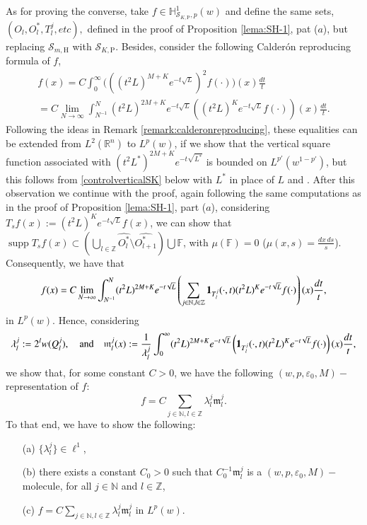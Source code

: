 \documentclass[11pt, a4paper,leqno]{amsart}
\newcommand{\mm}{\mathfrak{m}}
\renewcommand{\chi}{{\bf 1}}
\theoremstyle{plain}
\theoremstyle{definition}
\theoremstyle{remark}
\numberwithin{equation}{section}
\def \R{ \mathbb{R} }
\def \N{ \mathbb{N} }
\def \Z{ \mathbb{Z} }
\def \Scal{ \mathcal{S} }
\def \hh{ \mathrm{H} }
\def \pp{ \mathrm{P} }
\DeclareMathOperator{\supp}{supp}
\begin{document}
As for proving the converse, take $f\in  \mathbb{H}^1_{\Scal_{K,\pp},p}(w)$ and define the same
sets, $(O_l, O^*_l, T_l^j, etc),$ defined in the proof of Proposition
\ref{lema:SH-1}, pat ($a$), but replacing $\Scal_{m,\hh}$ with $\Scal_{K,\pp}$. Besides, consider the following Calder{{\'o}}n reproducing formula of $f$,
\begin{multline*}
f(x)=C\int_{0}^{\infty}\Bigg(\left((t^2L)^{M+K}e^{-t\sqrt{L}}\right)^{2}f(\cdot)\Bigg)(x)
\frac{dt}{t}
\\
= C\lim_{N\rightarrow \infty}\int_{N^{-1}}^{N}(t^2L)^{2M+K}e^{-t \sqrt{L}}
\left((t^2L)^{K}e^{-t\sqrt{L}}
f(\cdot)\right)(x)\frac{dt}{t}.
\end{multline*}
Following the ideas in Remark \ref{remark:calderonreproducing}, these equalities can be extended from $L^2(\R^n)$ to $L^p(w)$, if we show that the vertical square function associated with $(t^2L^*)^{2M+K}e^{-t \sqrt{L^*}}$ is bounded on $L^{p'}(w^{1-p'})$, but this follows from  
\eqref{controlverticalSK} below with $L^*$ in place of $L$ and \cite{AuscherMartell:III}. After this observation we continue with the proof, again following the same computations as in the proof of Proposition
\ref{lema:SH-1}, part ($a$), considering $T_sf(x):=(t^2L)^{K}e^{-t\sqrt{L}}
f(x)$, we can show that $\supp T_sf(x)\subset \left(\bigcup_{l\in \Z} \widehat{O^*_l}\setminus \widehat{O^*_{l+1}}\right)\bigcup \mathbb{F}$, with $\mu(\mathbb{F})=0$ ($\mu(x,s)=\frac{dx\,ds}{s}$).
Consequently, we have that
\begin{align*}
f(x)= C\lim_{N\rightarrow \infty}\int_{N^{-1}}^{N}(t^2L)^{2M+K}e^{-t \sqrt{L}}
\left(\sum_{j\in \N, l\in \Z}\chi_{T_l^j}(\cdot,t)(t^2L)^{K}e^{-t\sqrt{L}}
f(\cdot)\right)(x)\frac{dt}{t},
\end{align*}
in $L^p(w)$.
Hence, considering
    \begin{align*}
\lambda_{l}^j:=2^lw(Q_l^j), \quad \textrm{and} \quad
\mm_l^j(x):=\frac{1}{\lambda_l^j}
\int_{0}^{\infty}(t^2L)^{2M+K}e^{-t\sqrt{L}}
\left(\chi_{T_l^j}(\cdot,t)(t^2L)^{K}e^{-t\sqrt{L}}
f(\cdot)\right)(x)\frac{dt}{t},
\end{align*}
we show that, for some constant $C>0$, we have the following $(w,p,\varepsilon_0,M)-$representation of $f$:
$$
f=C\sum_{j\in \N, l\in \Z}\lambda_l^j\mm_l^j.
$$
To that end, we have to show the following:
\begin{enumerate}
\item[(a)] $\{\lambda_l^j\}\in \ell^1$,

\item [(b)] there exists a constant
$C_0>0$ such that $C_0^{-1}\mm_l^j$ is a $(w,p,\varepsilon_0,M)-$molecule, for all $j\in \N$ and $l\in \Z$,

\item[(c)] $f=C\sum_{j\in \N, l\in \Z}\lambda_l^j\mm_l^j$ in
$L^p(w)$.
\end{enumerate}
\end{document}
